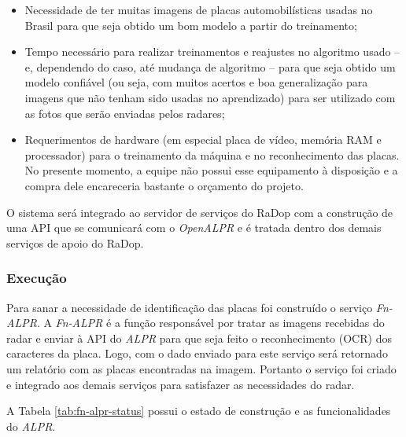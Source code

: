 \begin{itemize}
    \item Necessidade de ter muitas imagens de placas automobilísticas usadas no Brasil para que seja obtido um bom modelo a partir do treinamento;
    \item Tempo necessário para realizar treinamentos e reajustes no algoritmo usado -- e, dependendo do caso, até mudança de algoritmo -- para que seja obtido um modelo confiável (ou seja, com muitos acertos e boa generalização para imagens que não tenham sido usadas no aprendizado) para ser utilizado com as fotos que serão enviadas pelos radares;
    \item Requerimentos de hardware (em especial placa de vídeo, memória RAM e processador) para o treinamento da máquina e no reconhecimento das placas. No presente momento, a equipe não possui esse equipamento à disposição e a compra dele encareceria bastante o orçamento do projeto.
\end{itemize}

O sistema será integrado ao servidor de serviços do RaDop com a construção de uma API que se comunicará com o \textit{OpenALPR} e é tratada dentro dos demais serviços de apoio do RaDop.

\subsubsection{Execução}

Para sanar a necessidade de identificação das placas foi construído o serviço \textit{Fn-ALPR}. A \textit{Fn-ALPR} é a função responsável por tratar as imagens recebidas do radar e enviar à API do \textit{ALPR} para que seja feito o reconhecimento (OCR) dos caracteres da placa. Logo, com o dado enviado para este serviço será retornado um relatório com as placas encontradas na imagem. Portanto o serviço foi criado e integrado aos demais serviços para satisfazer as necessidades do radar.

A Tabela \ref{tab:fn-alpr-status} possui o estado de construção e as funcionalidades do \textit{ALPR}.

